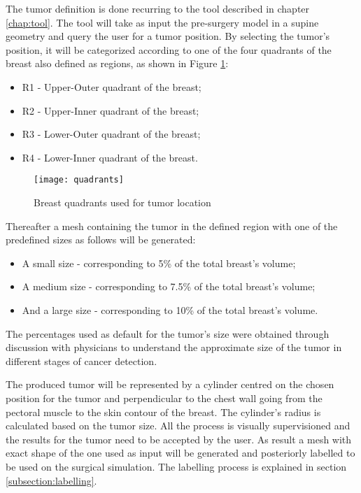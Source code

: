 The tumor definition is done recurring to the tool described in chapter \ref{chap:tool}. The tool will take as input the pre-surgery model in a supine geometry and query the user for a tumor position. By selecting the tumor's position, it will be categorized according to one of the four quadrants of the breast also defined as regions, as shown in Figure \ref{fig:regions}:
\begin{itemize}
\item R1 - Upper-Outer quadrant of the breast;
\item R2 - Upper-Inner quadrant of the breast;
\item R3 - Lower-Outer quadrant of the breast;
\item R4 - Lower-Inner quadrant of the breast.
\end{itemize}

\begin{figure}[!htb]
\begin{center}
    \leavevmode
    \texttt{[image: quadrants]}
    \caption[Breast quadrants used for tumor location]{Breast quadrants used for tumor location}
    \label{fig:regions}
  \end{center}
\end{figure}


Thereafter a mesh containing the tumor in the defined region with one of the predefined sizes as follows will be generated:

\begin{itemize}
\item A small size - corresponding to 5\% of the total breast's volume;
\item A medium size - corresponding to 7.5\% of the total breast's volume;
\item And a large size - corresponding to 10\% of the total breast's volume.
\end{itemize}


The percentages used as default for the tumor's size were obtained through discussion with physicians to understand the approximate size of the tumor in different stages of cancer detection.

The produced tumor will be represented by a cylinder centred on the chosen position for the tumor and perpendicular to the chest wall going from the pectoral muscle to the skin contour of the breast. The cylinder's radius is calculated based on the tumor size. All the process is visually supervisioned and the results for the tumor need to be accepted by the user. As result a mesh with exact shape of the one used as input will be generated and posteriorly labelled to be used on the surgical simulation. The labelling process is explained in section \ref{subsection:labelling}.


